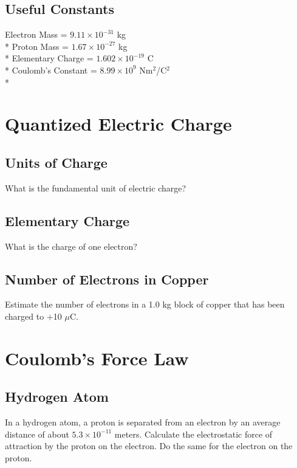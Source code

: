 \documentclass[11pt]{article}
\begin{document}
\maketitle
\tableofcontents
\hspace{30mm}

\subsection*{Useful Constants}
Electron Mass = $9.11 \times 10^{-31}$ kg \\*
Proton Mass = $1.67 \times 10^{-27}$ kg \\*
Elementary Charge = $1.602 \times 10^{-19}$ C \\*
Coulomb's Constant = $8.99 \times 10^9$ Nm$^2$/C$^2$ \\*


\pagebreak
\section{Quantized Electric Charge}

\subsection{Units of Charge}
What is the fundamental unit of electric charge?

\subsection{Elementary Charge}
What is the charge of one electron?

\subsection{Number of Electrons in Copper}
Estimate the number of electrons in a 1.0 kg block of copper that has been charged to +10 $\mu$C.


\pagebreak
\section{Coulomb's Force Law}

\subsection{Hydrogen Atom}
In a hydrogen atom, a proton is separated from an electron by an average distance of about $5.3 \times 10^{-11}$ meters.  Calculate the electrostatic force of attraction by the proton on the electron.  Do the same for the electron on the proton.
\end{document}
